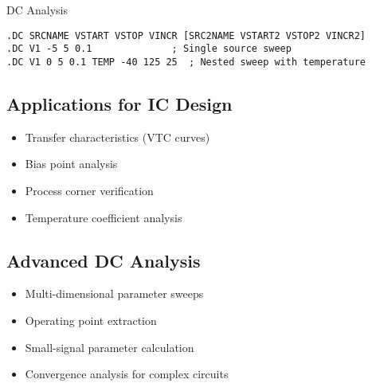 \documentclass{beamer}
\begin{document}
\begin{frame}{DC Analysis}
    \begin{lstlisting}
.DC SRCNAME VSTART VSTOP VINCR [SRC2NAME VSTART2 VSTOP2 VINCR2]
.DC V1 -5 5 0.1              ; Single source sweep
.DC V1 0 5 0.1 TEMP -40 125 25  ; Nested sweep with temperature
    \end{lstlisting}
    
    \subsection{Applications for IC Design}
    \begin{itemize}
        \item Transfer characteristics (VTC curves)
        \item Bias point analysis
        \item Process corner verification
        \item Temperature coefficient analysis
    \end{itemize}
    
    \subsection{Advanced DC Analysis}
    \begin{itemize}
        \item Multi-dimensional parameter sweeps
        \item Operating point extraction
        \item Small-signal parameter calculation
        \item Convergence analysis for complex circuits
    \end{itemize}
\end{frame}
\end{document}

